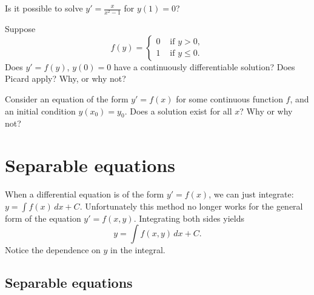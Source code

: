 \begin{exercise}
Is it possible to solve $y' = \frac{x}{x^2-1}$ for $y(1) = 0$?
\end{exercise}



\begin{exercise}[tricky]
Suppose
\begin{equation*}
f(y) =
\begin{cases}
0 & \text{ if $y > 0$}, \\
1 & \text{ if $y \leq 0$} .
\end{cases}
\end{equation*}
Does $y' = f(y)$, $y(0) = 0$ have a continuously differentiable solution?  Does Picard apply?  Why, or why not?
\end{exercise}

\begin{exercise}
Consider an equation of the form $y' = f(x)$ for some continuous function
$f$, and an initial condition $y(x_0) = y_0$.  Does a
solution exist for all $x$?  Why or why not?
\end{exercise}


\sectionnewpage
\section{Separable equations}
\label{separable:section}



When a differential equation is of the form
$y' = f(x)$,
we can just integrate:
$y = \int f(x) \,dx + C$. 
Unfortunately this method no longer works for the
general form of the equation
$y' = f(x,y)$.
Integrating both sides yields
\begin{equation*}
y = \int f(x,y) \,dx + C .
\end{equation*}
Notice the dependence on $y$ in the integral.

\subsection{Separable equations}


